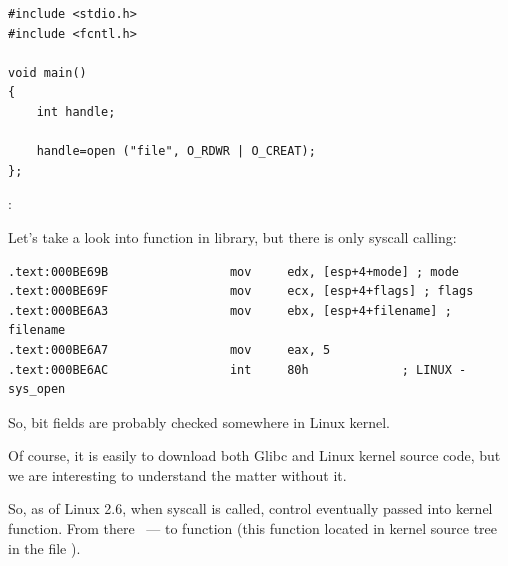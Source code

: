 
\begin{lstlisting}
#include <stdio.h>
#include <fcntl.h>

void main()
{
	int handle;

	handle=open ("file", O_RDWR | O_CREAT);
};
\end{lstlisting}

:



{Let's take a look into  function in  library, but there is only syscall calling:}

\begin{lstlisting}
.text:000BE69B                 mov     edx, [esp+4+mode] ; mode
.text:000BE69F                 mov     ecx, [esp+4+flags] ; flags
.text:000BE6A3                 mov     ebx, [esp+4+filename] ; filename
.text:000BE6A7                 mov     eax, 5
.text:000BE6AC                 int     80h             ; LINUX - sys_open
\end{lstlisting}

{So,  bit fields are probably checked somewhere in Linux kernel.}

{Of course, it is easily to download both Glibc and Linux kernel source code, 
but we are interesting to understand the matter without it.}

{So, as of Linux 2.6, when  syscall is called, control eventually passed into  kernel function.
From there ~--- to  function (this function located in kernel source tree in the file ).}

\newcommand{\URLREGPARM}{\url{http://ohse.de/uwe/articles/gcc-attributes.html\#func-regparm}}

